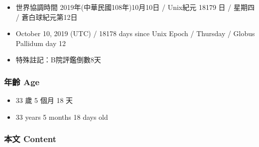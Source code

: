 \documentclass[a5paper, 12pt
]{book}
\providecommand{\tightlist}{%
  \setlength{\itemsep}{0pt}\setlength{\parskip}{0pt}}
\begin{document}
\begin{itemize}
\tightlist
\item
  世界協調時間 2019年(中華民國108年)10月10日 / Unix紀元 18179 日 /
  星期四 / 蒼白球紀元第12日
\item
  October 10, 2019 (UTC) / 18178 days since Unix Epoch / Thursday /
  Globus Pallidum day 12
\item
  特殊註記：B院評鑑倒數8天
\end{itemize}

\hypertarget{ux5e74ux9f61-age-11}{%
\subsubsection{年齡 Age}\label{ux5e74ux9f61-age-11}}

\begin{itemize}
\tightlist
\item
  33 歲 5 個月 18 天
\item
  33 years 5 months 18 days old
\end{itemize}

\hypertarget{ux672cux6587-content-11}{%
\subsubsection{本文 Content}\label{ux672cux6587-content-11}}
\end{document}
